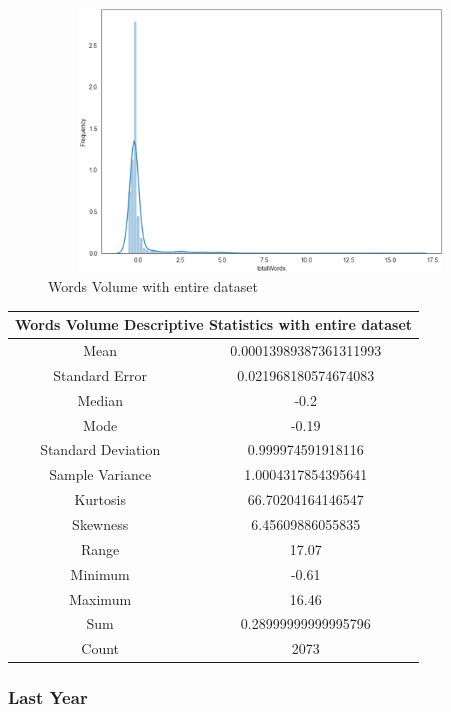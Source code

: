 \begin{figure}[h!]
\centering
\includegraphics[width=15cm,height=7cm,keepaspectratio]{resultsEvaluation/wordsDescMax.png}
\caption{Words Volume with entire dataset}
\label{fig:appendix_wordsDescMax}
\end{figure}
\begin{center}
\begin{tabular}{ c c }
\hline
\multicolumn{2}{|c|}{Words Volume Descriptive Statistics with entire dataset} \\
\hline
Mean & 0.00013989387361311993 \\
Standard Error & 0.021968180574674083 \\
Median & -0.2 \\
Mode & -0.19 \\
Standard Deviation & 0.999974591918116 \\
Sample Variance & 1.0004317854395641 \\
Kurtosis & 66.70204164146547 \\
Skewness & 6.45609886055835 \\
Range & 17.07 \\
Minimum & -0.61 \\
Maximum & 16.46 \\
Sum & 0.28999999999995796 \\
Count & 2073
\end{tabular}
\end{center}

\subsubsection{Last Year}

